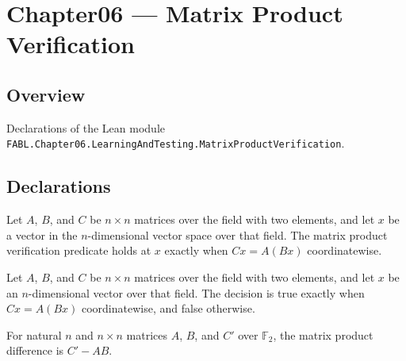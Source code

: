 \chapter{Chapter06 — Matrix Product Verification}
\section{Overview}

Declarations of the Lean module \texttt{FABL.Chapter06.LearningAndTesting.MatrixProductVerification}.

\section{Declarations}

\begin{definition}
\label{FABL.matrixProductVerificationPredicate}
\leanok
{}
Let $A$, $B$, and $C$ be $n\times n$ matrices over the field with two elements, and let
$x$ be a vector in the $n$-dimensional vector space over that field. The matrix product
verification predicate holds at $x$ exactly when $Cx=A(Bx)$ coordinatewise.
\end{definition}

\begin{definition}
\label{FABL.matrixProductVerificationDecision}
\leanok
{}
Let $A$, $B$, and $C$ be $n\times n$ matrices over the field with two elements, and let
$x$ be an $n$-dimensional vector over that field. The decision is true exactly when
$Cx=A(Bx)$ coordinatewise, and false otherwise.
\end{definition}

\begin{definition}
\label{FABL.matrixProductDifference}
\leanok
{}
For natural $n$ and $n\times n$ matrices $A$, $B$, and $C'$ over $\mathbb{F}_2$, the
matrix product difference is $C'-AB$.
\end{definition}

